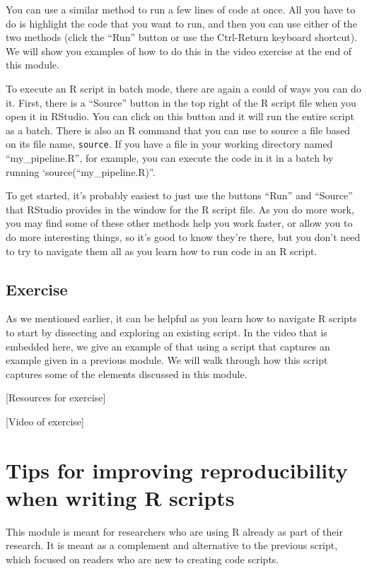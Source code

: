 \documentclass[]{tufte-book}
\begin{document}
You can use a similar method to run a few lines of code at once. All you have to
do is highlight the code that you want to run, and then you can use either of
the two methods (click the ``Run'' button or use the Ctrl-Return keyboard shortcut).
We will show you examples of how to do this in the video exercise at the end
of this module.

To execute an R script in batch mode, there are again a could of ways you can do
it. First, there is a ``Source'' button in the top right of the R script file when
you open it in RStudio. You can click on this button and it will run the entire
script as a batch. There is also an R command that you can use to source a file
based on its file name, \texttt{source}. If you have a file in your working directory
named ``my\_pipeline.R'', for example, you can execute the code in it in a batch by
running `source(``my\_pipeline.R)''.

To get started, it's probably easiest to just use the buttons ``Run'' and ``Source''
that RStudio provides in the window for the R script file. As you do more work, you
may find some of these other methods help you work faster, or allow you to do
more interesting things, so it's good to know they're there, but you don't need
to try to navigate them all as you learn how to run code in an R script.

\subsection{Exercise}\label{exercise}

As we mentioned earlier, it can be helpful as you learn how to navigate R
scripts to start by dissecting and exploring an existing script. In the video
that is embedded here, we give an example of that using a script that captures
an example given in a previous module. We will walk through how this script
captures some of the elements discussed in this module.

{[}Resources for exercise{]}

{[}Video of exercise{]}

\section{Tips for improving reproducibility when writing R scripts}\label{module13a}

This module is meant for researchers who are using R already as part of their
research. It is meant as a complement and alternative to the previous script,
which focused on readers who are new to creating code scripts.
\end{document}
